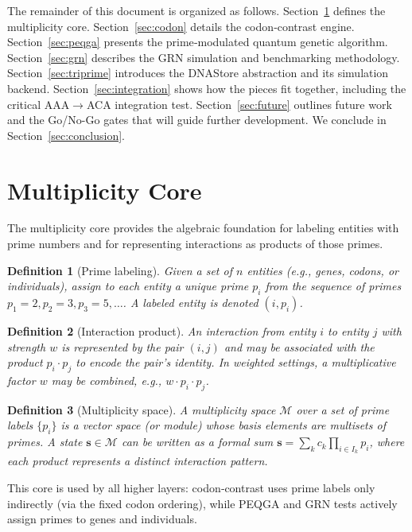 \documentclass[12pt]{article}
\newtheorem{definition}{Definition}[section]
\begin{document}
The remainder of this document is organized as follows. Section~\ref{sec:multiplicity} defines the multiplicity core. Section~\ref{sec:codon} details the codon‑contrast engine. Section~\ref{sec:peqga} presents the prime‑modulated quantum genetic algorithm. Section~\ref{sec:grn} describes the GRN simulation and benchmarking methodology. Section~\ref{sec:triprime} introduces the DNAStore abstraction and its simulation backend. Section~\ref{sec:integration} shows how the pieces fit together, including the critical AAA$\to$ACA integration test. Section~\ref{sec:future} outlines future work and the Go/No-Go gates that will guide further development. We conclude in Section~\ref{sec:conclusion}.

\section{Multiplicity Core}
\label{sec:multiplicity}

The multiplicity core provides the algebraic foundation for labeling entities with prime numbers and for representing interactions as products of those primes.

\begin{definition}[Prime labeling]
Given a set of $n$ entities (e.g., genes, codons, or individuals), assign to each entity a unique prime $p_i$ from the sequence of primes $p_1=2, p_2=3, p_3=5, \dots$. A labeled entity is denoted $(i, p_i)$.
\end{definition}

\begin{definition}[Interaction product]
An interaction from entity $i$ to entity $j$ with strength $w$ is represented by the pair $(i,j)$ and may be associated with the product $p_i \cdot p_j$ to encode the pair’s identity. In weighted settings, a multiplicative factor $w$ may be combined, e.g., $w \cdot p_i \cdot p_j$.
\end{definition}

\begin{definition}[Multiplicity space]
A multiplicity space $\mathcal{M}$ over a set of prime labels $\{p_i\}$ is a vector space (or module) whose basis elements are multisets of primes. A state $\mathbf{s} \in \mathcal{M}$ can be written as a formal sum $\mathbf{s} = \sum_k c_k \prod_{i \in I_k} p_i$, where each product represents a distinct interaction pattern.
\end{definition}

This core is used by all higher layers: codon‑contrast uses prime labels only indirectly (via the fixed codon ordering), while PEQGA and GRN tests actively assign primes to genes and individuals.
\end{document}

